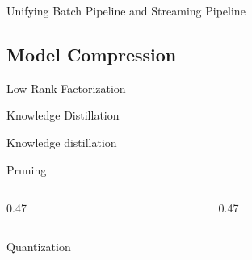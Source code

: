 \begin{frame}{Unifying Batch Pipeline and Streaming Pipeline}
  \begin{sidebody}
  \end{sidebody}
\end{frame}

\subsection{Model Compression}

\begin{frame}{Low-Rank Factorization}
  \begin{withmargin}
    \begin{tdmain}
    \end{tdmain}
    \begin{tdmargin}
    \end{tdmargin}
  \end{withmargin}
\end{frame}

\begin{frame}{Knowledge Distillation}
  \begin{tddef}{Knowledge distillation}
  \end{tddef}
\end{frame}

\begin{frame}{Pruning}
  \begin{columns}[T,onlytextwidth]
    \begin{column}{0.47\textwidth}
      \begin{tdblock}[equal height group=prune]
      \end{tdblock}
    \end{column}
    \begin{column}{0.47\textwidth}
      \begin{tdblock}[equal height group=prune]
      \end{tdblock}
    \end{column}
  \end{columns}
\end{frame}

\begin{frame}{Quantization}
  \begin{tdcode}
  \end{tdcode}
  \begin{takeaway}
  \end{takeaway}
\end{frame}

